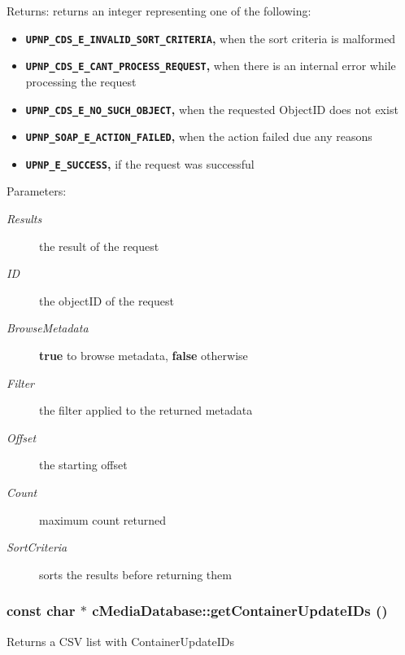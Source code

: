 \begin{Desc}
\item[Returns:]returns an integer representing one of the following:\begin{itemize}
\item {\bf {\tt UPNP\_\-CDS\_\-E\_\-INVALID\_\-SORT\_\-CRITERIA},} when the sort criteria is malformed\item {\bf {\tt UPNP\_\-CDS\_\-E\_\-CANT\_\-PROCESS\_\-REQUEST},} when there is an internal error while processing the request\item {\bf {\tt UPNP\_\-CDS\_\-E\_\-NO\_\-SUCH\_\-OBJECT},} when the requested ObjectID does not exist\item {\bf {\tt UPNP\_\-SOAP\_\-E\_\-ACTION\_\-FAILED},} when the action failed due any reasons\item {\bf {\tt UPNP\_\-E\_\-SUCCESS},} if the request was successful \end{itemize}
\end{Desc}
\begin{Desc}
\item[Parameters:]
\begin{description}
\item[{\em Results}]the result of the request \item[{\em ID}]the objectID of the request \item[{\em BrowseMetadata}]{\bf true} to browse metadata, {\bf false} otherwise \item[{\em Filter}]the filter applied to the returned metadata \item[{\em Offset}]the starting offset \item[{\em Count}]maximum count returned \item[{\em SortCriteria}]sorts the results before returning them \end{description}
\end{Desc}
\hypertarget{classcMediaDatabase_dadd330e273e0f354d51b76cee436198}{
\subsubsection[{getContainerUpdateIDs}]{\setlength{\rightskip}{0pt plus 5cm}const char $\ast$ cMediaDatabase::getContainerUpdateIDs ()}}
\label{classcMediaDatabase_dadd330e273e0f354d51b76cee436198}


Returns a CSV list with ContainerUpdateIDs

